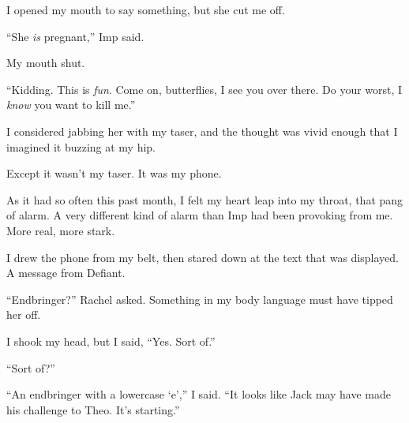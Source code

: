 I opened my mouth to say something, but she cut me off.



``She \emph{is} pregnant,'' Imp said.



My mouth shut.



``Kidding.  This is \emph{fun}.  Come on, butterflies, I see you over there.  Do your worst, I \emph{know} you want to kill me.''



I considered jabbing her with my taser, and the thought was vivid enough that I imagined it buzzing at my hip.



Except it wasn't my taser.  It was my phone.



As it had so often this past month, I felt my heart leap into my throat, that pang of alarm.  A very different kind of alarm than Imp had been provoking from me.  More real, more stark.



I drew the phone from my belt, then stared down at the text that was displayed.  A message from Defiant.



``Endbringer?'' Rachel asked.  Something in my body language must have tipped her off.



I shook my head, but I said, ``Yes.  Sort of.''



``Sort of?''



``An endbringer with a lowercase `e','' I said.  ``It looks like Jack may have made his challenge to Theo.  It's starting.''





